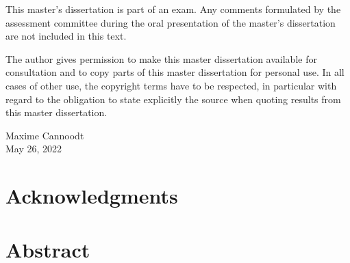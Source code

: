 \documentclass[a4paper,oneside]{book}
\begin{document}

\afterpage{\null\newpage}




\restoregeometry
\newpage
    
\fontsize{10pt}{14pt}\selectfont

\frontmatter

\newpage
\fancyhf{} %
This master's dissertation is part of an exam. Any comments formulated by the assessment
committee during the oral presentation of the master's dissertation are not included in this
text.
\vspace{0.5cm}

The author gives permission to make this master dissertation available for consultation and to copy parts of this master dissertation for personal use.
In all cases of other use, the copyright terms have to be respected, in particular with regard to the obligation to state explicitly the source when quoting results from this master dissertation.

\vspace{1cm}
\begin{flushright}
Maxime Cannoodt \\
May 26, 2022
\end{flushright}

\newpage

\pagestyle{fancy}
\fancyhf{} %
\fancyhead[L]{\nouppercase\leftmark}
\cfoot{\thepage}


\chapter*{Acknowledgments} \label{chapter:ack}
 

\chapter*{Abstract} \label{chapter:abstract}
 
\end{document}
